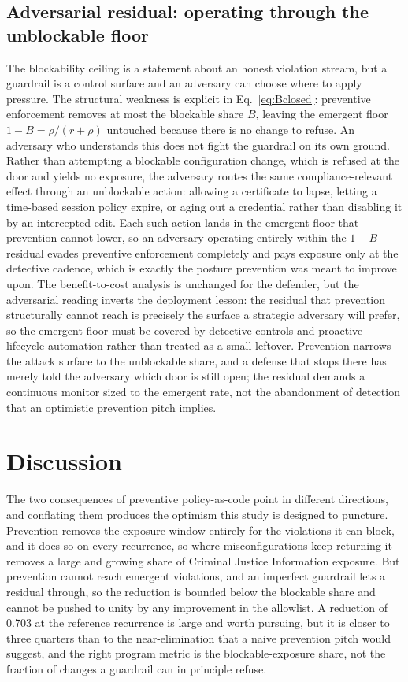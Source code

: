 \documentclass[journal]{IEEEtran}
\begin{document}
\subsection{Adversarial residual: operating through the unblockable floor}
The blockability ceiling is a statement about an honest violation stream, but a guardrail is a
control surface and an adversary can choose where to apply pressure. The structural weakness is
explicit in Eq.~\eqref{eq:Bclosed}: preventive enforcement removes at most the blockable share $B$,
leaving the emergent floor $1 - B = \rho/(r+\rho)$ untouched because there is no change to refuse.
An adversary who understands this does not fight the guardrail on its own ground. Rather than
attempting a blockable configuration change, which is refused at the door and yields no exposure,
the adversary routes the same compliance-relevant effect through an unblockable action: allowing a
certificate to lapse, letting a time-based session policy expire, or aging out a credential rather
than disabling it by an intercepted edit. Each such action lands in the emergent floor that
prevention cannot lower, so an adversary operating entirely within the $1 - B$ residual evades
preventive enforcement completely and pays exposure only at the detective cadence, which is exactly
the posture prevention was meant to improve upon. The benefit-to-cost analysis is unchanged for the
defender, but the adversarial reading inverts the deployment lesson: the residual that prevention
structurally cannot reach is precisely the surface a strategic adversary will prefer, so the
emergent floor must be covered by detective controls and proactive lifecycle automation rather than
treated as a small leftover. Prevention narrows the attack surface to the unblockable share, and a
defense that stops there has merely told the adversary which door is still open; the residual
demands a continuous monitor sized to the emergent rate, not the abandonment of detection that an
optimistic prevention pitch implies.

\section{Discussion}
The two consequences of preventive policy-as-code point in different directions, and conflating them
produces the optimism this study is designed to puncture. Prevention removes the exposure window
entirely for the violations it can block, and it does so on every recurrence, so where
misconfigurations keep returning it removes a large and growing share of Criminal Justice
Information exposure. But prevention cannot reach emergent violations, and an imperfect guardrail
lets a residual through, so the reduction is bounded below the blockable share and cannot be pushed
to unity by any improvement in the allowlist. A reduction of 0.703 at the reference recurrence is
large and worth pursuing, but it is closer to three quarters than to the near-elimination that a
naive prevention pitch would suggest, and the right program metric is the blockable-exposure share,
not the fraction of changes a guardrail can in principle refuse.
\end{document}
